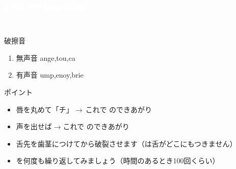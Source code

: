 \documentclass[aspectratio=169,xcolor={dvipsnames,table}]{beamer}
\begin{document}
\begin{frame}
\centering
  \textcolor{white}{\Huge\bfseries Today's Pronunciation}\pause

 \vspace{30pt}

  \textcolor{white}{\Huge\bfseries {}, }


\end{frame}
 \begin{frame}[plain]{破擦音}

\large

\begin{enumerate}
 \item  無声音 \hspace{20pt}ange,\hspace{1\zw}tou,\hspace{1\zw}ca
 \item  有声音 \hspace{20pt}ump,\hspace{1\zw}enoy,\hspace{1\zw}brie
\end{enumerate}

\vspace*{20pt}

\normalsize
ポイント

\begin{itemize}
 \item 唇を丸めて「チ」$\rightarrow$\,これで\,\,のできあがり 
 \item 声を出せば$\rightarrow$これで\,\,のできあがり
 \item 舌先を歯茎につけてから破裂させます（は舌がどこにもつきません）
 \item {}を何度も繰り返してみましょう（時間のあるとき100回くらい）
\end{itemize}
\hfill{}



\end{frame}
\end{document}
